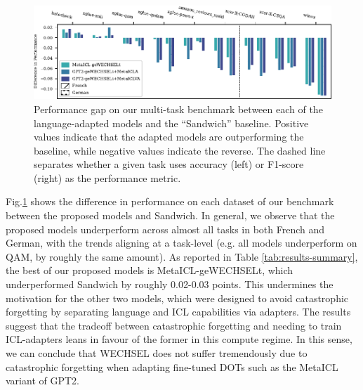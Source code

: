 \documentclass[11pt]{article}
\begin{document}
\begin{figure}[ht]
	\includegraphics{results.pdf}
	\caption{Performance gap on our multi-task benchmark between each of the language-adapted models
		and the ``Sandwich'' baseline. Positive values indicate that the adapted models are
		outperforming the baseline, while negative values indicate the reverse. The dashed line
		separates whether a given task uses accuracy (left) or F1-score (right) as the performance
		metric.}
	\label{fig:results}
\end{figure}

Fig.\@ \ref{fig:results} shows the difference in performance on each dataset of our benchmark
between the proposed models and Sandwich. In general, we observe that the proposed models
underperform across almost all tasks in both French and German, with the trends aligning at
a task-level (e.g. all models underperform on QAM, by roughly the same amount). As reported in Table
\ref{tab:results-summary}, the best of our proposed models is MetaICL-geWECHSELt, which
underperformed Sandwich by roughly 0.02-0.03 points. This undermines the motivation for the other
two models, which were designed to avoid catastrophic forgetting by separating language and ICL
capabilities via adapters. The results suggest that the tradeoff between catastrophic forgetting and
needing to train ICL-adapters leans in favour of the former in this compute regime. In this sense,
we can conclude that WECHSEL does not suffer tremendously due to catastrophic forgetting when
adapting fine-tuned DOTs such as the MetaICL variant of GPT2.
\end{document}
